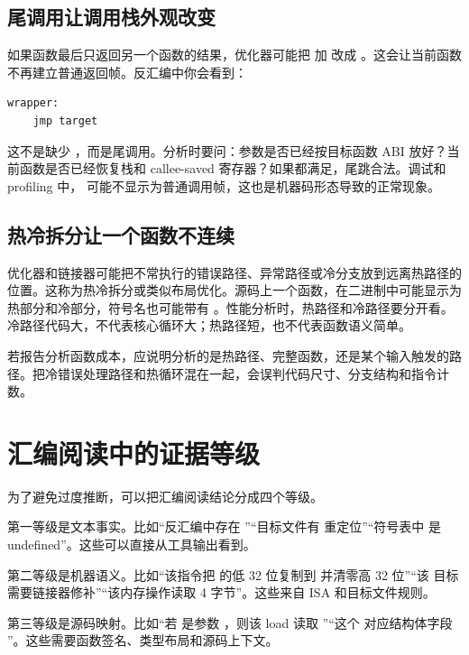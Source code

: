 \subsection{尾调用让调用栈外观改变}

如果函数最后只返回另一个函数的结果，优化器可能把  加  改成 。这会让当前函数不再建立普通返回帧。反汇编中你会看到：

\begin{lstlisting}
wrapper:
    jmp target
\end{lstlisting}

这不是缺少 ，而是尾调用。分析时要问：参数是否已经按目标函数 ABI 放好？当前函数是否已经恢复栈和 callee-saved 寄存器？如果都满足，尾跳合法。调试和 profiling 中， 可能不显示为普通调用帧，这也是机器码形态导致的正常现象。

\subsection{热冷拆分让一个函数不连续}

优化器和链接器可能把不常执行的错误路径、异常路径或冷分支放到远离热路径的位置。这称为热冷拆分或类似布局优化。源码上一个函数，在二进制中可能显示为热部分和冷部分，符号名也可能带有 。性能分析时，热路径和冷路径要分开看。冷路径代码大，不代表核心循环大；热路径短，也不代表函数语义简单。

若报告分析函数成本，应说明分析的是热路径、完整函数，还是某个输入触发的路径。把冷错误处理路径和热循环混在一起，会误判代码尺寸、分支结构和指令计数。

\section{汇编阅读中的证据等级}

为了避免过度推断，可以把汇编阅读结论分成四个等级。

第一等级是文本事实。比如“反汇编中存在 ”“目标文件有  重定位”“符号表中  是 undefined”。这些可以直接从工具输出看到。

第二等级是机器语义。比如“该指令把  的低 32 位复制到  并清零高 32 位”“该  目标需要链接器修补”“该内存操作读取 4 字节”。这些来自 ISA 和目标文件规则。

第三等级是源码映射。比如“若  是参数 ，则该 load 读取 ”“这个  对应结构体字段 ”。这些需要函数签名、类型布局和源码上下文。

